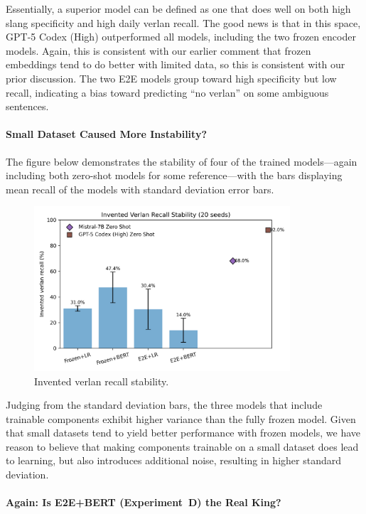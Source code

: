 \documentclass[12pt]{article}
\begin{document}
Essentially, a superior model can be defined as one that does well on both high slang specificity and high daily verlan recall. The good news is that in this space, GPT-5 Codex (High) outperformed all models, including the two frozen encoder models. Again, this is consistent with our earlier comment that frozen embeddings tend to do better with limited data, so this is consistent with our prior discussion. The two E2E models group toward high specificity but low recall, indicating a bias toward predicting ``no verlan'' on some ambiguous sentences.

\paragraph{Small Dataset Caused More Instability?}

The figure below demonstrates the stability of four of the trained models\;---\;again including both zero-shot models for some reference\;---\;with the bars displaying mean recall of the models with standard deviation error bars.

\begin{figure}[H]
    \centering
    \includegraphics[width=0.85\textwidth]{figures/invented_recall_variance.png}
    \caption{Invented verlan recall stability.}
    \label{fig:invented-variance}
\end{figure}

Judging from the standard deviation bars, the three models that include trainable components exhibit higher variance than the fully frozen model. 
Given that small datasets tend to yield better performance with frozen models, we have reason to believe that making components trainable on a small dataset does lead to learning, but also introduces additional noise, resulting in higher standard deviation.

\paragraph{Again: Is E2E+BERT (Experiment~D) the Real King?}
\end{document}
